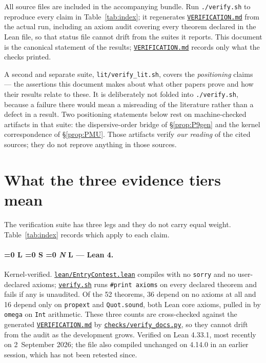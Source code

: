 \documentclass[11pt]{article}
\newcommand{\file}[1]{\href{run:#1}{\texttt{#1}}}
\newcommand{\tier}[1]{%
  \ifnum\pdfstrcmp{#1}{L}=0 \textbf{L}%
  \else\ifnum\pdfstrcmp{#1}{S}=0 S%
  \else\ifnum\pdfstrcmp{#1}{N}=0 \emph{N}%
  \else #1\fi\fi\fi}
\begin{document}
All source files are included in the accompanying bundle. Run
\texttt{./verify.sh} to reproduce every claim in Table~\ref{tab:index}; it
regenerates \file{VERIFICATION.md} from the actual run, including an
axiom audit covering every theorem declared in the Lean file, so that
status file cannot drift from the suites it reports. This document is the
canonical statement of the results; \file{VERIFICATION.md} records only
what the checks printed.

A second and separate suite, \texttt{lit/verify\_lit.sh}, covers the
\emph{positioning} claims --- the assertions this document makes about what
other papers prove and how their results relate to these. It is deliberately
not folded into \texttt{./verify.sh}, because a failure there would mean a
misreading of the literature rather than a defect in a result. Two positioning
statements below rest on machine-checked artifacts in that suite: the
dispersive-order bridge of \S\ref{prop:P9gen} and the kernel correspondence of
\S\ref{prop:PMU}. Those artifacts verify \emph{our reading} of the cited
sources; they do not reprove anything in those sources.

\section{What the three evidence tiers mean}
\label{sec:tiers}

The verification suite has three legs and they do not carry equal weight.
Table~\ref{tab:index} records which apply to each claim.

\paragraph{\tier{L} --- Lean 4.} Kernel-verified. \file{lean/EntryContest.lean}
compiles with no \texttt{sorry} and no user-declared axioms; \file{verify.sh}
runs \texttt{\#print axioms} on every declared theorem and fails if any is
unaudited. Of the 52 theorems, 36 depend on no axioms at all and 16 depend
only on \texttt{propext} and \texttt{Quot.sound}, both Lean core axioms,
pulled in by \texttt{omega} on \texttt{Int} arithmetic. These three counts are
cross-checked against the generated \file{VERIFICATION.md} by
\file{checks/verify\_docs.py}, so they cannot drift from the audit as the
development grows. Verified on Lean 4.33.1, most recently on 2~September 2026;
the file also compiled unchanged on 4.14.0 in an earlier session, which has not
been retested since.
\end{document}
